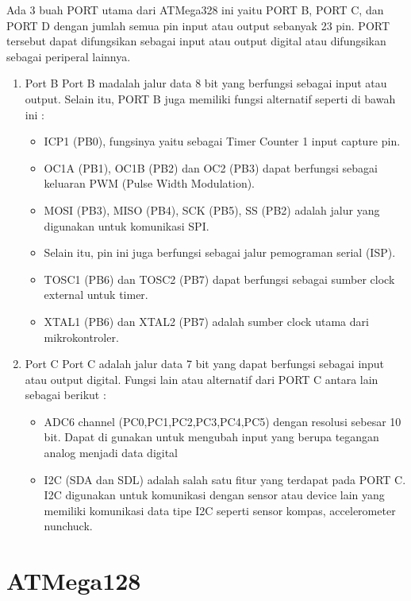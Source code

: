 	Ada 3 buah PORT utama dari ATMega328 ini yaitu PORT B, PORT C, dan PORT D dengan jumlah semua pin input atau output sebanyak 23 pin. PORT tersebut dapat difungsikan sebagai input atau output digital atau difungsikan sebagai periperal lainnya.
	\begin{enumerate}
	\item Port B 
		Port B madalah jalur data 8 bit yang berfungsi sebagai input atau output. Selain itu, PORT B juga memiliki fungsi alternatif seperti di bawah ini :
		\begin{itemize}
			\item ICP1 (PB0), fungsinya yaitu sebagai Timer Counter 1 input capture pin. 
			\item OC1A (PB1), OC1B (PB2) dan OC2 (PB3) dapat berfungsi sebagai keluaran PWM (Pulse Width Modulation).
			\item MOSI (PB3), MISO (PB4), SCK (PB5), SS (PB2) adalah jalur yang digunakan untuk komunikasi SPI.
			\item Selain itu, pin ini juga berfungsi sebagai jalur pemograman serial (ISP).
			\item TOSC1 (PB6) dan TOSC2 (PB7) dapat berfungsi sebagai sumber clock external untuk timer.
			\item XTAL1 (PB6) dan XTAL2 (PB7) adalah sumber clock utama dari mikrokontroler.
		\end{itemize}
		
	\item Port C
		Port C adalah jalur data 7 bit yang dapat berfungsi sebagai input atau output digital. Fungsi lain atau alternatif dari PORT C antara lain sebagai berikut :
		\begin {itemize}
			\item ADC6 channel (PC0,PC1,PC2,PC3,PC4,PC5) dengan resolusi sebesar 10 bit. Dapat di gunakan untuk mengubah input yang berupa tegangan analog menjadi data digital
			\item I2C (SDA dan SDL) adalah salah satu fitur yang terdapat pada PORT C. I2C digunakan untuk komunikasi dengan sensor atau device lain yang memiliki komunikasi data tipe I2C seperti sensor kompas, accelerometer nunchuck. 
		\end {itemize}

	\end{enumerate}
\section{ATMega128}
